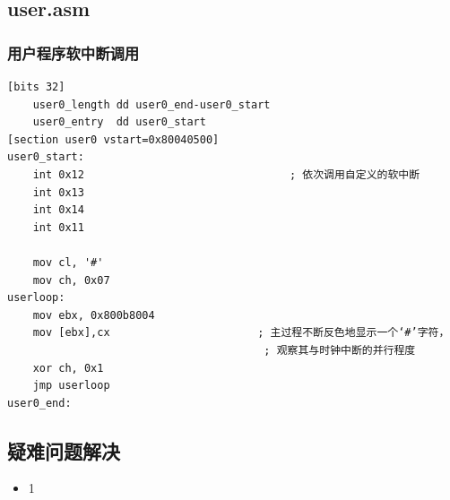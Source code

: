 \documentclass[a4paper,11pt,UTF8]{ctexart}
\newcommand{\bottomcaption}{%
\setlength{\abovecaptionskip}{6pt}%
\setlength{\belowcaptionskip}{6pt}%
\caption}
\begin{document}
	\subsection{user.asm}
		\subsubsection{用户程序软中断调用}
	\begin{lstlisting}[caption={user0 asm},tabsize=4,basicstyle=\footnotesize,captionpos=b]
[bits 32]
	user0_length dd user0_end-user0_start
	user0_entry  dd user0_start
[section user0 vstart=0x80040500]
user0_start:
	int 0x12                                ; 依次调用自定义的软中断
	int 0x13
	int 0x14
	int 0x11

	mov cl, '#'
	mov ch, 0x07
userloop:
	mov ebx, 0x800b8004
	mov [ebx],cx                       ; 主过程不断反色地显示一个‘#’字符，
										; 观察其与时钟中断的并行程度
	xor ch, 0x1
	jmp userloop
user0_end:
	\end{lstlisting}
	
			
		
	
	
		
		


\subsection{疑难问题解决}
	
	\begin{itemize}			
		\item 1
	\end{itemize}
\end{document}
